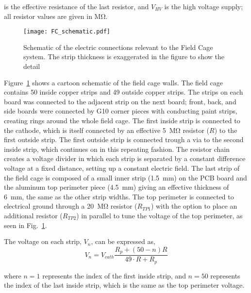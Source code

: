 is the effective resistance of the last resistor, and $V_{HV}$ is the high voltage supply; all resistor values are given in \si{\mega\ohm}.


\begin{figure}[!htb]
\centering
\texttt{[image: FC\_schematic.pdf]}
\caption{Schematic of the electric connections relevant to the Field Cage system. The strip thickness is exaggerated in the figure to show the detail}
\label{fig:FC_schematic}
\end{figure}

Figure~\ref{fig:FC_schematic} shows a cartoon schematic of the field cage walls. The field cage contains 50 inside copper strips and 49 outside copper strips. The strips on each board was connected to the adjacent strip on the next board; front, back, and side boards were connected by G10 corner pieces with conducting paint strips, creating rings around the whole field cage. The first inside strip is connected to the cathode, which is itself connected by an effective \SI{5}{\mega\ohm} resistor ($R$) to the first outside strip. The first outside strip is connected trough a via to the second inside strip, which continues on in this repeating fashion. The resistor chain creates a voltage divider in which each strip is separated by a constant difference voltage at a fixed distance, setting up a constant electric field. The last strip of the field cage is composed of a small inner strip  (\SI{1.5}{\milli\metre}) on the PCB board and the aluminum top perimeter piece (\SI{4.5}{\milli\metre}) giving an  effective thickness of \SI{6}{\milli\metre}, the same as the other strip widths. The top perimeter is connected to electrical ground through a \SI{20}{\mega\ohm} resistor ($R_{TP1}$) with the option to place an additional resistor ($R_{TP2}$) in parallel to tune the voltage of the top perimeter, as seen in Fig.~\ref{fig:FC_schematic}. 

The voltage on each strip, $V_n$, can be expressed as, 
\begin{equation}
V_n = V_{cath} \frac{R_p + (50 - n)R}{49\cdot R + R_p}
\label{eq:FCstrip}
\end{equation}

where $n = 1$ represents the index of the first inside strip, and $n= 50$ represents the index of the last inside strip, which is the same as the top perimeter voltage.



